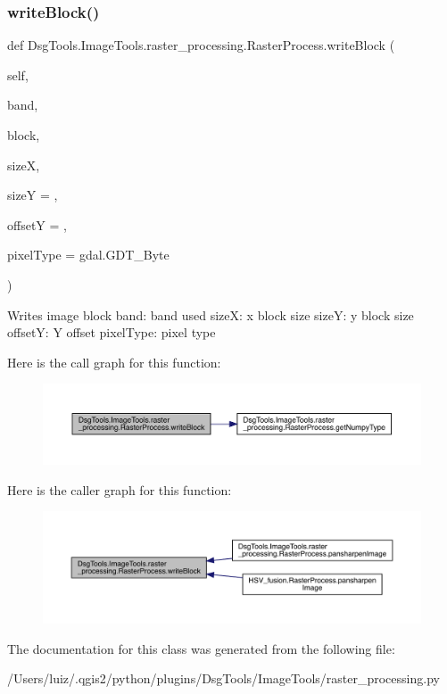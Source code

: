 \subsubsection{\texorpdfstring{write\+Block()}{writeBlock()}}
{\footnotesize\ttfamily def Dsg\+Tools.\+Image\+Tools.\+raster\+\_\+processing.\+Raster\+Process.\+write\+Block (\begin{DoxyParamCaption}\item[{}]{self,  }\item[{}]{band,  }\item[{}]{block,  }\item[{}]{sizeX,  }\item[{}]{sizeY = {},  }\item[{}]{offsetY = {},  }\item[{}]{pixel\+Type = {\ttfamily gdal.GDT\+\_\+Byte} }\end{DoxyParamCaption})}

\begin{DoxyVerb}Writes image block
band: band used
sizeX: x block size
sizeY: y block size
offsetY: Y offset
pixelType: pixel type
\end{DoxyVerb}
 Here is the call graph for this function\+:
\nopagebreak
\begin{figure}[H]
\begin{center}
\leavevmode
\includegraphics[width=350pt]{class_dsg_tools_1_1_image_tools_1_1raster__processing_1_1_raster_process_abd1c9e282d7419d6f808986c26f7bdd2_cgraph}
\end{center}
\end{figure}
Here is the caller graph for this function\+:
\nopagebreak
\begin{figure}[H]
\begin{center}
\leavevmode
\includegraphics[width=350pt]{class_dsg_tools_1_1_image_tools_1_1raster__processing_1_1_raster_process_abd1c9e282d7419d6f808986c26f7bdd2_icgraph}
\end{center}
\end{figure}


The documentation for this class was generated from the following file\+:\begin{DoxyCompactItemize}
\item 
/\+Users/luiz/.\+qgis2/python/plugins/\+Dsg\+Tools/\+Image\+Tools/raster\+\_\+processing.\+py\end{DoxyCompactItemize}
